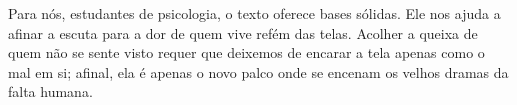 \documentclass[12pt, a4paper, oneside]{abntex2}
\renewcommand{\bibname}{\textbf{\MakeUppercase{REFERÊNCIAS}}}
\begin{document}
Para nós, estudantes de psicologia, o texto oferece bases sólidas. Ele nos ajuda a afinar a escuta para a dor de quem vive refém das telas. Acolher a queixa de quem não se sente visto requer que deixemos de encarar a tela apenas como o mal em si; afinal, ela é apenas o novo palco onde se encenam os velhos dramas da falta humana.
\fi

\postextual
{}

\renewcommand{\bibname}{\MakeUppercase{REFERÊNCIAS}}

\end{document}
